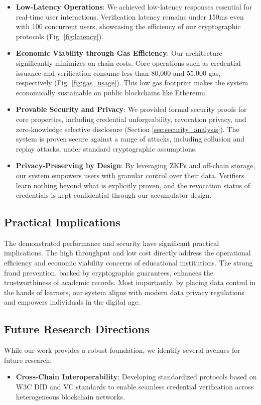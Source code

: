 \documentclass[lettersize,journal]{IEEEtran}
\begin{document}
\begin{itemize}
\begin{itemize}
    \item \textbf{Low-Latency Operations}: We achieved low-latency responses essential for real-time user interactions. Verification latency remains under 150ms even with 100 concurrent users, showcasing the efficiency of our cryptographic protocols (Fig. \ref{fig:latency}).

    \item \textbf{Economic Viability through Gas Efficiency}: Our architecture significantly minimizes on-chain costs. Core operations such as credential issuance and verification consume less than 80,000 and 55,000 gas, respectively (Fig. \ref{fig:gas_usage}). This low gas footprint makes the system economically sustainable on public blockchains like Ethereum.

    \item \textbf{Provable Security and Privacy}: We provided formal security proofs for core properties, including credential unforgeability, revocation privacy, and zero-knowledge selective disclosure (Section \ref{sec:security_analysis}). The system is proven secure against a range of attacks, including collusion and replay attacks, under standard cryptographic assumptions.

    \item \textbf{Privacy-Preserving by Design}: By leveraging ZKPs and off-chain storage, our system empowers users with granular control over their data. Verifiers learn nothing beyond what is explicitly proven, and the revocation status of credentials is kept confidential through our accumulator design.
\end{itemize}

\subsection{Practical Implications}
The demonstrated performance and security have significant practical implications. The high throughput and low cost directly address the operational efficiency and economic viability concerns of educational institutions. The strong fraud prevention, backed by cryptographic guarantees, enhances the trustworthiness of academic records. Most importantly, by placing data control in the hands of learners, our system aligns with modern data privacy regulations and empowers individuals in the digital age.

\subsection{Future Research Directions}
While our work provides a robust foundation, we identify several avenues for future research:
\begin{itemize}
    \item \textbf{Cross-Chain Interoperability}: Developing standardized protocols based on W3C DID and VC standards to enable seamless credential verification across heterogeneous blockchain networks.


\end{itemize}
\end{itemize}
\end{document}
